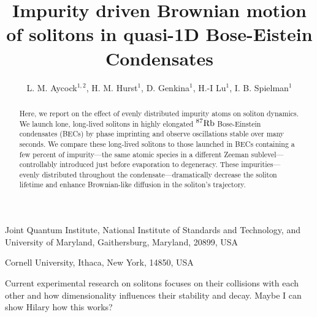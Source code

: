\documentclass{nature}
\title{Impurity driven Brownian motion of solitons in quasi-1D Bose-Eistein Condensates}
\author{ L. M. Aycock$^{1,2}$, H. M. Hurst$^1$,  D. Genkina$^1$, H.-I Lu$^{1}$, I. B. Spielman$^1$}
\def\Rb87{^{87}\rm{Rb}}					%
\begin{document}
\maketitle
\begin{affiliations}
 \item Joint Quantum Institute, National Institute of Standards and Technology, and University of Maryland, Gaithersburg, Maryland, 20899, USA
 \item Cornell University, Ithaca, New York, 14850, USA
\end{affiliations}

\begin{abstract}
Here, we report on the effect of evenly distributed impurity atoms on soliton dynamics. We launch lone, long-lived solitons in highly elongated $\Rb87$ Bose-Einstein condensates (BECs) by phase imprinting and observe oscillations stable over many seconds. We compare these long-lived solitons to those launched in BECs containing a few percent of impurity---the same atomic species in a different Zeeman sublevel---controllably introduced just before evaporation to degeneracy. These impurities---evenly distributed throughout the condensate---dramatically decrease the soliton lifetime and enhance Brownian-like diffusion in the soliton's trajectory.
\end{abstract}

Current experimental research on solitons focuses on their collisions with each other\cite{Becker2013,Weller2008} and how dimensionality influences their stability and decay\cite{Ku2014}. Maybe I can show Hilary how this works?
\end{document}
